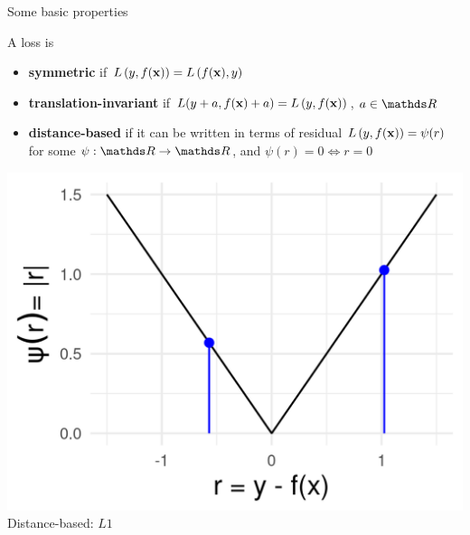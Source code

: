 \documentclass[11pt,compress,t,notes=noshow, xcolor=table]{beamer}
\begin{document}
\begin{vbframe}{Some basic properties}

A loss is  
\begin{itemize}
  \item \textbf{symmetric} if $L\left(y, f(\mathbf{x})\right) = L\left(f(\mathbf{x}), y\right)$
  \item \textbf{translation-invariant} if $L(y + a, f(\mathbf{x}) + a) = L\left(y, f(\mathbf{x})\right)$, 
  $a \in \R$
  \item \textbf{distance-based} if it can be written in terms of residual 
    $L\left(y, f(\mathbf{x})\right) = \psi (r)$ for some $\psi: \R \to \R$, and 
    $\psi(r) = 0 \Leftrightarrow r = 0$
 \end{itemize}


\vfill

\begin{minipage}[b]{0.32\textwidth}
  \includegraphics[width=\textwidth]{figure/loss_dist_based}
  \tiny \centering
  Distance-based: $L1$
\end{minipage}%
\begin{minipage}[b]{0.265\textwidth}

\end{minipage}
\end{vbframe}
\end{document}
